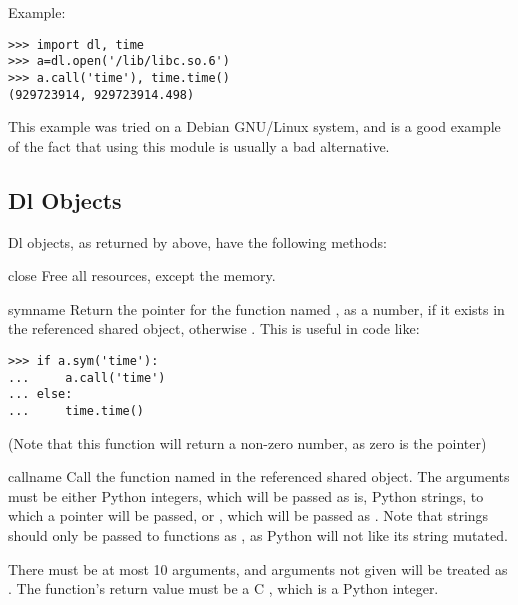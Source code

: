 Example:

\begin{verbatim}
>>> import dl, time
>>> a=dl.open('/lib/libc.so.6')
>>> a.call('time'), time.time()
(929723914, 929723914.498)
\end{verbatim}

This example was tried on a Debian GNU/Linux system, and is a good
example of the fact that using this module is usually a bad alternative.

\subsection{Dl Objects \label{dl-objects}}

Dl objects, as returned by  above, have the
following methods:

\begin{methoddesc}{close}{}
Free all resources, except the memory.
\end{methoddesc}

\begin{methoddesc}{sym}{name}
Return the pointer for the function named , as a number, if
it exists in the referenced shared object, otherwise . This
is useful in code like:

\begin{verbatim}
>>> if a.sym('time'): 
...     a.call('time')
... else: 
...     time.time()
\end{verbatim}

(Note that this function will return a non-zero number, as zero is the
\NULL{} pointer)
\end{methoddesc}

\begin{methoddesc}{call}{name}
Call the function named  in the referenced shared object.
The arguments must be either Python integers, which will be 
passed as is, Python strings, to which a pointer will be passed, 
or , which will be passed as \NULL{}. Note that 
strings should only be passed to functions as , as
Python will not like its string mutated.

There must be at most 10 arguments, and arguments not given will be
treated as . The function's return value must be a C
, which is a Python integer.
\end{methoddesc}
